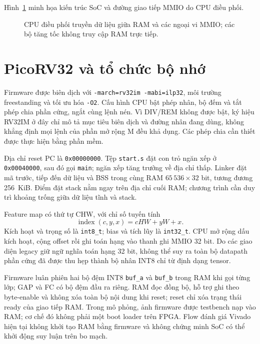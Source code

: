 Hình~\ref{fig:soc-placeholder} minh họa kiến trúc SoC và đường giao tiếp MMIO do CPU điều phối.

\begin{figure}[!ht]
\captionsetup{aboveskip=6pt,belowskip=0pt}
\centering
\resizebox{0.93\textwidth}{!}{}
\caption{CPU điều phối truyền dữ liệu giữa RAM và các ngoại vi MMIO; các bộ tăng tốc không truy cập RAM trực tiếp.}
\label{fig:soc-placeholder}
\end{figure}

\section{PicoRV32 và tổ chức bộ nhớ}
Firmware được biên dịch với \texttt{-march=rv32im -mabi=ilp32}, môi trường freestanding và tối ưu hóa \texttt{-O2}. Cấu hình CPU bật phép nhân, bộ đếm và tắt phép chia phần cứng, ngắt cùng lệnh nén. Vì DIV/REM không được bật, ký hiệu RV32IM ở đây chỉ mô tả mục tiêu biên dịch và đường nhân đang dùng, không khẳng định mọi lệnh của phần mở rộng M đều khả dụng. Các phép chia cần thiết được thực hiện bằng phần mềm.

Địa chỉ reset PC là \texttt{0x00000000}. Tệp \texttt{start.s} đặt con trỏ ngăn xếp ở \texttt{0x00040000}, sau đó gọi \texttt{main}; ngăn xếp tăng trưởng về địa chỉ thấp. Linker đặt mã trước, tiếp đến dữ liệu và BSS trong cùng RAM $65\,536\times32$ bit, tương đương 256~KiB. Điểm đặt stack nằm ngay trên địa chỉ cuối RAM; chương trình cần duy trì khoảng trống giữa dữ liệu tĩnh và stack.

Feature map có thứ tự CHW, với chỉ số tuyến tính
\begin{equation}
 \operatorname{index}(c,y,x)=cHW+yW+x.
\end{equation}
Kích hoạt và trọng số là \texttt{int8\_t}; bias và tích lũy là \texttt{int32\_t}. CPU mở rộng dấu kích hoạt, cộng offset rồi ghi toán hạng vào thanh ghi MMIO 32 bit. Do các giao diện legacy giữ ngữ nghĩa toán hạng 32 bit, không thể suy ra toàn bộ datapath phần cứng đã được thu hẹp thành bộ nhân INT8 chỉ từ định dạng tensor.

Firmware luân phiên hai bộ đệm INT8 \texttt{buf\_a} và \texttt{buf\_b} trong RAM khi gọi từng lớp; GAP và FC có bộ đệm đầu ra riêng. RAM đọc đồng bộ, hỗ trợ ghi theo byte-enable và không xóa toàn bộ nội dung khi reset; reset chỉ xóa trạng thái ready của giao tiếp RAM. Trong mô phỏng, ảnh firmware được testbench nạp vào RAM; cơ chế đó không phải một boot loader trên FPGA. Flow đánh giá Vivado hiện tại không khởi tạo RAM bằng firmware và không chứng minh SoC có thể khởi động suy luận trên bo mạch.

